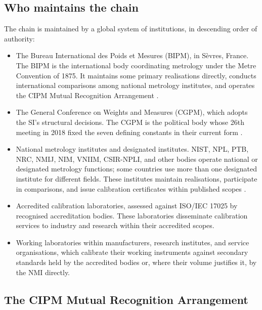 \subsection{Who maintains the chain}

The chain is maintained by a global system of institutions, in
descending order of authority:

\begin{itemize}[leftmargin=*]
  \item The Bureau International des Poids et Mesures (BIPM), in
    S\`evres, France. The BIPM is the international body
    coordinating metrology under the Metre Convention of 1875. It
    maintains some primary realisations directly, conducts
    international comparisons among national metrology institutes,
    and operates the CIPM Mutual Recognition Arrangement
    \cite{std:bipm-cipm-mra}.
  \item The General Conference on Weights and Measures (CGPM),
    which adopts the SI's structural decisions. The CGPM is the
    political body whose 26th meeting in 2018 fixed the seven
    defining constants in their current form
    \cite{std:bipm-si2019}.
  \item National metrology institutes and designated institutes.
    NIST, NPL, PTB, NRC, NMIJ, NIM, VNIIM, CSIR-NPLI, and other
    bodies operate national or designated metrology functions; some
    countries use more than one designated institute for different
    fields. These institutes maintain realisations, participate in
    comparisons, and issue calibration certificates within published
    scopes \cite{std:bipm-cipm-mra}.
  \item Accredited calibration laboratories, assessed against
    ISO/IEC 17025 \cite{std:iso-iec-17025} by recognised accreditation
    bodies. These laboratories disseminate calibration services to
    industry and research within their accredited scopes.
  \item Working laboratories within manufacturers, research
    institutes, and service organisations, which calibrate their
    working instruments against secondary standards held by the
    accredited bodies or, where their volume justifies it, by the
    NMI directly.
\end{itemize}

\subsection{The CIPM Mutual Recognition Arrangement}


